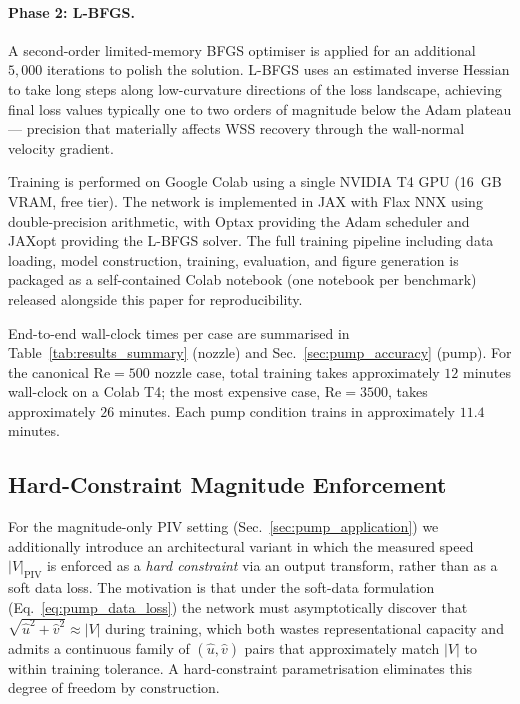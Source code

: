 \documentclass[12pt,a4paper]{article}
\newcommand{\Reyn}{\mathrm{Re}}    %
\begin{document}
\paragraph{Phase 2: L-BFGS.} A second-order limited-memory
BFGS optimiser \cite{Liu1989} is applied for an additional
$5{,}000$ iterations to polish the solution. L-BFGS uses an
estimated inverse Hessian to take long steps along
low-curvature directions of the loss landscape, achieving final
loss values typically one to two orders of magnitude below the
Adam plateau --- precision that materially affects WSS recovery
through the wall-normal velocity gradient.

Training is performed on Google Colab using a single NVIDIA T4
GPU (16~GB VRAM, free tier). The network is implemented in JAX
with Flax NNX \cite{Frostig2018JAX} using double-precision
arithmetic, with Optax \cite{deepmind2020optax} providing the
Adam scheduler and JAXopt \cite{Blondel2022JAXopt} providing
the L-BFGS solver. The full training pipeline including data
loading, model construction, training, evaluation, and figure
generation is packaged as a self-contained Colab notebook (one
notebook per benchmark) released alongside this paper for
reproducibility.

End-to-end wall-clock times per case are summarised in
Table~\ref{tab:results_summary} (nozzle) and
Sec.~\ref{sec:pump_accuracy} (pump). For the canonical $\Reyn =
500$ nozzle case, total training takes approximately $12$
minutes wall-clock on a Colab T4; the most expensive case,
$\Reyn = 3500$, takes approximately $26$ minutes. Each pump
condition trains in approximately $11.4$ minutes.

\subsection{Hard-Constraint Magnitude Enforcement}
\label{sec:hard_constraint}

For the magnitude-only PIV setting (Sec.~\ref{sec:pump_application})
we additionally introduce an architectural variant in which the
measured speed $|V|_{\text{PIV}}$ is enforced as a \emph{hard
constraint} via an output transform, rather than as a soft data
loss. The motivation is that under the soft-data formulation
(Eq.~\ref{eq:pump_data_loss}) the network must asymptotically
discover that $\sqrt{\hat{u}^2 + \hat{v}^2} \approx |V|$ during
training, which both wastes representational capacity and admits a
continuous family of $(\hat{u}, \hat{v})$ pairs that approximately
match $|V|$ to within training tolerance. A hard-constraint
parametrisation eliminates this degree of freedom by construction.
\end{document}
